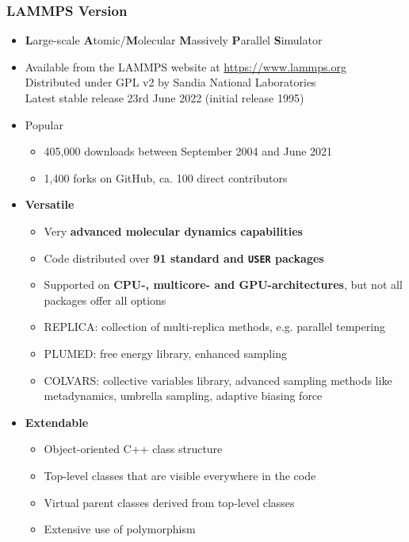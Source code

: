 \documentclass[slidestop,compress,9pt]{beamer}
\begin{document}
\begin{frame}
\frametitle{LAMMPS Version}
\begin{itemize}
\item \textbf{L}arge-scale \textbf{A}tomic/\textbf{M}olecular \textbf{M}assively \textbf{P}arallel \textbf{S}imulator
\item Available from the LAMMPS website at \href{https://www.lammps.org}{https://www.lammps.org}\\
Distributed under GPL v2 by Sandia National Laboratories\\
Latest stable release 23rd June 2022 (initial release 1995)
\item Popular
\begin{itemize}
\item 405,000 downloads between September 2004 and June 2021
\item 1,400 forks on GitHub, ca. 100 direct contributors
\end{itemize}
\item \textbf{Versatile}
\begin{itemize}
\item Very \textbf{advanced molecular dynamics capabilities}
\item Code distributed over \textbf{91 standard and \texttt{USER} packages}
\item Supported on \textbf{CPU-, multicore- and GPU-architectures}, but not all packages offer all options
\item REPLICA: collection of multi-replica methods, e.g. parallel tempering
\item PLUMED: free energy library, enhanced sampling
\item COLVARS: collective variables library, advanced sampling methods like metadynamics, umbrella sampling, adaptive biasing force 
\end{itemize}
\item \textbf{Extendable}
\begin{itemize}
\item Object-oriented C++ class structure
\item Top-level classes that are visible everywhere in the code
\item Virtual parent classes derived from top-level classes
\item Extensive use of polymorphism
\end{itemize}
\end{itemize}


\end{frame}
\end{document}
